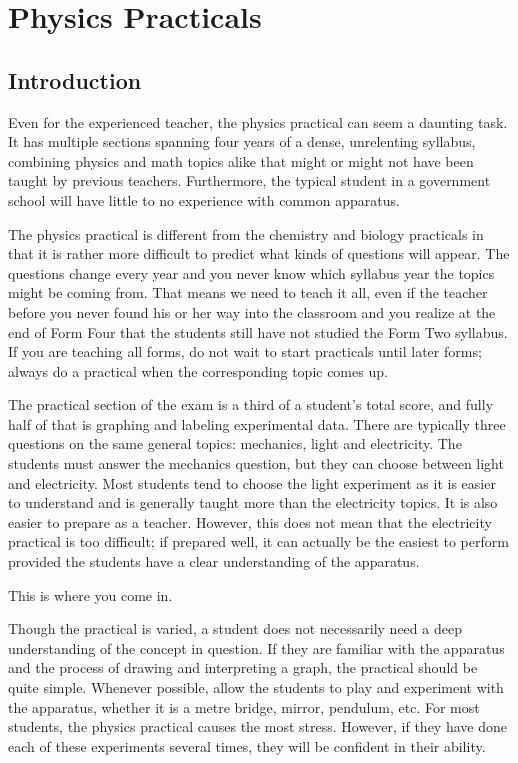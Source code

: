 \documentclass[12pt,a4paper]{report}
\begin{document}
\chapter{Physics Practicals}

\section{Introduction}

Even for the experienced teacher, the physics practical can seem a daunting task.
It has multiple sections spanning four years of a dense, unrelenting syllabus, combining
physics and math topics alike that might or might not have been taught by previous
teachers. Furthermore, the typical student in a government school will have little to no
experience with common apparatus.

The physics practical is different from the chemistry and biology practicals in that
it is rather more difficult to predict what kinds of questions will appear. The questions
change every year and you never know which syllabus year the topics might be coming
from. That means we need to teach it all, even if the teacher before you never found his
or her way into the classroom and you realize at the end of Form Four that the students
still have not studied the Form Two syllabus. If you are teaching all forms, do not wait to
start practicals until later forms; always do a practical when the corresponding topic
comes up.

The practical section of the exam is a third of a student’s total score, and fully half
of that is graphing and labeling experimental data. There are typically three questions on
the same general topics: mechanics, light and electricity. The students must answer the
mechanics question, but they can choose between light and electricity. Most students tend
to choose the light experiment as it is easier to understand and is generally taught more
than the electricity topics. It is also easier to prepare as a teacher. However, this does not
mean that the electricity practical is too difficult; if prepared well, it can actually be the
easiest to perform provided the students have a clear understanding of the apparatus.

This is where you come in.

Though the practical is varied, a student does not necessarily need a deep
understanding of the concept in question. If they are familiar with the apparatus and the
process of drawing and interpreting a graph, the practical should be quite simple.
Whenever possible, allow the students to play and experiment with the apparatus,
whether it is a metre bridge, mirror, pendulum, etc. For most students, the physics
practical causes the most stress. However, if they have done each of these experiments
several times, they will be confident in their ability.
\end{document}
